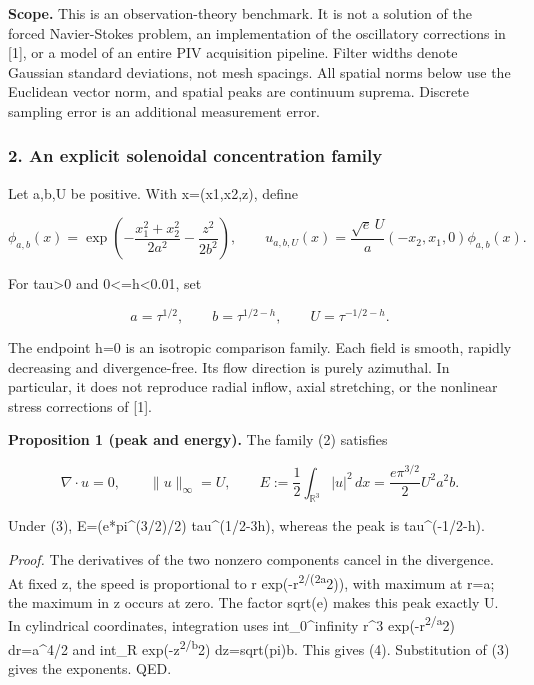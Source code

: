\documentclass[
]{article}
\begin{document}
\textbf{Scope.} This is an observation-theory benchmark. It is not a
solution of the forced Navier-Stokes problem, an implementation of the
oscillatory corrections in {[}1{]}, or a model of an entire PIV
acquisition pipeline. Filter widths denote Gaussian standard deviations,
not mesh spacings. All spatial norms below use the Euclidean vector
norm, and spatial peaks are continuum suprema. Discrete sampling error
is an additional measurement error.

\hypertarget{an-explicit-solenoidal-concentration-family}{%
\subsubsection{2. An explicit solenoidal concentration
family}\label{an-explicit-solenoidal-concentration-family}}

Let a,b,U be positive. With x=(x1,x2,z), define

\[
\phi_{a,b}(x)=\exp\!\left(-\frac{x_1^2+x_2^2}{2a^2}-\frac{z^2}{2b^2}\right),
\qquad
u_{a,b,U}(x)=\frac{\sqrt{e}\,U}{a}(-x_2,x_1,0)\phi_{a,b}(x). \tag{2}
\]

For tau\textgreater0 and 0\textless=h\textless0.01, set

\[
a=\tau^{1/2},\qquad b=\tau^{1/2-h},\qquad U=\tau^{-1/2-h}. \tag{3}
\]

The endpoint h=0 is an isotropic comparison family. Each field is
smooth, rapidly decreasing and divergence-free. Its flow direction is
purely azimuthal. In particular, it does not reproduce radial inflow,
axial stretching, or the nonlinear stress corrections of {[}1{]}.

\textbf{Proposition 1 (peak and energy).} The family (2) satisfies

\[
\nabla\cdot u=0,\qquad \|u\|_\infty=U,\qquad
E:=\frac12\int_{\mathbb R^3}|u|^2\,dx
=\frac{e\pi^{3/2}}2 U^2a^2b. \tag{4}
\]

Under (3), E=(e*pi\^{}(3/2)/2) tau\^{}(1/2-3h), whereas the peak is
tau\^{}(-1/2-h).

\emph{Proof.} The derivatives of the two nonzero components cancel in
the divergence. At fixed z, the speed is proportional to r
exp(-r\textsuperscript{2/(2a}2)), with maximum at r=a; the maximum in z
occurs at zero. The factor sqrt(e) makes this peak exactly U. In
cylindrical coordinates, integration uses int\_0\^{}infinity r\^{}3
exp(-r\textsuperscript{2/a}2) dr=a\^{}4/2 and int\_R
exp(-z\textsuperscript{2/b}2) dz=sqrt(pi)b. This gives (4). Substitution
of (3) gives the exponents. QED.
\end{document}
